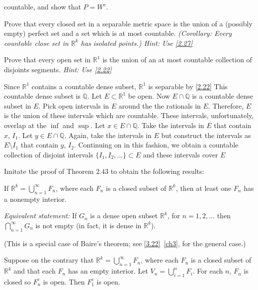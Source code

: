 \begin{exercise}
{    countable, and show that \(P = W^c\).}
\item
  Prove that every closed set in a separable metric space is the union of a
  (possibly empty) perfect set and a set which is at most countable.
  \textit{(Corollary: Every countable close set in \(\mathbb{R}^k\) has
    isolated points.)
    Hint: Use \cref{2.27}}
\item
  \label{2.29}
  Prove that every open set in \(\mathbb{R}^1\) is the union of an at most
  countable collection of disjoints segments.
  \textit{Hint: Use \cref{2.22}}
  \par\smallskip
  Since \(\mathbb{R}^1\) contains a countable dense subset, \(\mathbb{R}^1\) is
  separable by \cref{2.22}
  This countable dense subset is \(\mathbb{Q}\).
  Let \(E\subset\mathbb{R}^1\) be open.
  Now \(E\cap\mathbb{Q}\) is a countable dense subset in \(E\).
  Pick open intervals in \(E\) around the the rationals in \(E\).
  Therefore, \(E\) is the union of these intervals which are countable.
  These intervals, unfortunately, overlap at the \(\inf\) and \(\sup\).
  Let \(x\in E\cap\mathbb{Q}\).
  Take the intervals in \(E\) that contain \(x\), \(I_1\).
  Let \(y\in E\cap\mathbb{Q}\).
  Again, take the intervals in \(E\) but construct the intervals as
  \(E\setminus I_1\) that contain \(y\), \(I_2\).
  Continuing on in this fashion, we obtain a countable collection of disjoint
  intervals \(\{I_1,I_2,\ldots\}\subset E\) and these intervals cover \(E\)
\item
  Imitate the proof of Theorem \(2.43\) to obtain the following results:
  \par\smallskip
  If \(\mathbb{R}^k = \bigcup_{n = 1}^{\infty}F_n\), where each \(F_n\) is a
  closed subset of \(\mathbb{R}^k\), then at least one \(F_n\) has a nonempty
  interior.
  \par\smallskip
  \textit{Equivalent statement:} If \(G_n\) is a dense open subset
  \(\mathbb{R}^k\), for \(n = 1,2,\ldots\) then
  \(\bigcap_{n = 1}^{\infty}G_n\) is not empty (in fact, it is dense in
  \(\mathbb{R}^k\)).
  \par\smallskip
  (This is a special case of Baire's theorem; see \cref{3.22}~\cref{ch3}, for
  the general case.)
  \par\smallskip
  Suppose on the contrary that \(\mathbb{R}^k = \bigcup_{n = 1}^{\infty}F_n\),
  where each \(F_n\) is a closed subset of \(\mathbb{R}^k\) and that each
  \(F_n\) has an empty interior.
  Let \(V_n = \bigcup_{i = 1}^nF_i\).
  For each \(n\), \(F_n\)  is closed so \(F_n^c\) is open.
  Then \(F_1^c\) is open.

\end{exercise}
